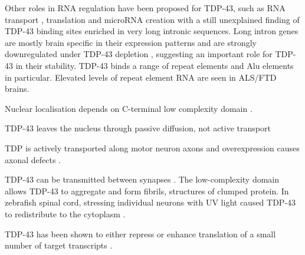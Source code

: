 Other roles in RNA regulation have been proposed for TDP-43, such as RNA transport \citep{Alami2013}, translation \citep{Freibaum2010-hw} and microRNA creation \citep{Kawahara2012} with a still unexplained finding of TDP-43 binding sites enriched in very long intronic sequences. 
Long intron genes are mostly brain specific in their expression patterns \citep{Sibley2015} and are strongly downregulated under TDP-43 depletion \citep{Polymenidou2011}, suggesting an important role for TDP-43 in their stability.  
TDP-43 binds a range of repeat elements \citep{Li2012,Zarnack2013,Kelley2014} and Alu elements in particular. Elevated levels of repeat element RNA are seen in ALS/FTD brains. %



Nuclear localisation depends on C-terminal low complexity domain \citep{Ayala2008}.

TDP-43 leaves the nucleus through passive diffusion, not active transport \citep{Ederle2018,Pinarbasi2018}

TDP is actively transported along motor neuron axons and overexpression causes axonal defects \citep{Fallini2012}.

TDP-43 can be transmitted between synapses \cite{Feiler2015}.
 The low-complexity domain allows TDP-43 to aggregate and form fibrils, structures of clumped protein. 
In zebrafish spinal cord, stressing individual neurons with UV light caused TDP-43 to redistribute to the cytoplasm \citep{Svahn2018}.




TDP-43 has been shown to either repress or enhance translation of a small number of target transcripts \citep{Majumder2012, Majumder2016, Neelagandan2018}.



